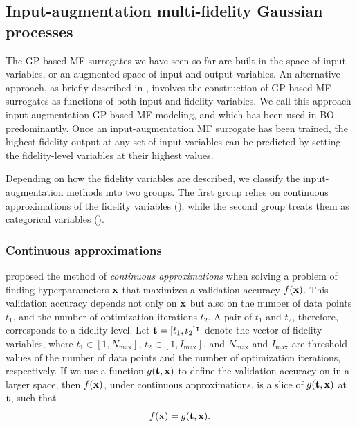 \documentclass[journal ]{new-aiaa}
\begin{document}
	\subsection{Input-augmentation multi-fidelity Gaussian processes}\label{Sec46}
	
	The GP-based MF surrogates we have seen so far are built in the space of input variables, or an augmented space of input and output variables.
	An alternative approach, as briefly described in , involves the construction of GP-based MF surrogates as functions of both input and fidelity variables.
	We call this approach input-augmentation GP-based MF modeling, and which has been used in BO predominantly.
	Once an input-augmentation MF surrogate has been trained, the highest-fidelity output at any set of input variables can be predicted by setting the fidelity-level variables at their highest values.
	
	Depending on how the fidelity variables are described, we classify the input-augmentation methods into two groups.
	The first group relies on continuous approximations of the fidelity variables (), while the second group treats them as categorical variables ().
	
	\subsubsection{Continuous approximations}\label{Sec461}
	
	\citet{Kandasamy2017} proposed the method of \textit{continuous approximations} when solving a problem of finding hyperparameters ${\bf x}$ that maximizes a validation accuracy $f({\bf x})$.
	This validation accuracy depends not only on ${\bf x}$ but also on the number of data points $t_1$, and the number of optimization iterations $t_2$.
	A pair of $t_1$ and $t_2$, therefore, corresponds to a fidelity level.
	Let ${\bf t}=[t_1,t_2]^\intercal$ denote the vector of fidelity variables, where $t_1 \in [1,N_{\max}]$, $t_2 \in [1,I_{\max}]$, and $N_{\max}$ and $I_{\max}$ are threshold values of the number of data points and the number of optimization iterations, respectively.
	If we use a function $g({\bf t},{\bf x})$ to define the validation accuracy on in a larger space, then $f({\bf x})$, under continuous approximations, is a slice of $g({\bf t},{\bf x})$ at ${\bf t}$, such that
	\begin{equation}\label{eqn29}
		f({\bf x}) = g({\bf t},{\bf x}).
	\end{equation}
	
\end{document}
